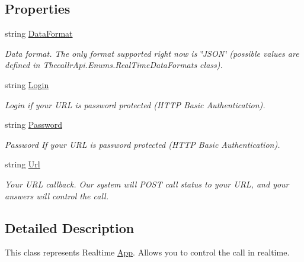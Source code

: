 \subsection*{Properties}
\begin{DoxyCompactItemize}
\item 
string \hyperlink{class_thecallr_api_1_1_objects_1_1_real_time_1_1_real_time_a666f2857f9d7284203450cc9e5920d41}{Data\+Format}
\begin{DoxyCompactList}\small\item\em Data format. The only format supported right now is \char`\"{}\+J\+S\+O\+N\char`\"{} (possible values are defined in Thecallr\+Api.\+Enums.\+Real\+Time\+Data\+Formats class). \end{DoxyCompactList}\item 
string \hyperlink{class_thecallr_api_1_1_objects_1_1_real_time_1_1_real_time_a7f00ac41d231c5d758a5294cd7a2777c}{Login}
\begin{DoxyCompactList}\small\item\em Login if your U\+R\+L is password protected (H\+T\+T\+P Basic Authentication). \end{DoxyCompactList}\item 
string \hyperlink{class_thecallr_api_1_1_objects_1_1_real_time_1_1_real_time_a6a97a4668e19618e11cef48eb86e5f65}{Password}
\begin{DoxyCompactList}\small\item\em Password If your U\+R\+L is password protected (H\+T\+T\+P Basic Authentication). \end{DoxyCompactList}\item 
string \hyperlink{class_thecallr_api_1_1_objects_1_1_real_time_1_1_real_time_a33ab53bd6843893ad4fda5488e94b16d}{Url}
\begin{DoxyCompactList}\small\item\em Your U\+R\+L callback. Our system will P\+O\+S\+T call status to your U\+R\+L, and your answers will control the call. \end{DoxyCompactList}\end{DoxyCompactItemize}


\subsection{Detailed Description}
This class represents Realtime \hyperlink{namespace_thecallr_api_1_1_objects_1_1_app}{App}. Allows you to control the call in realtime. 




